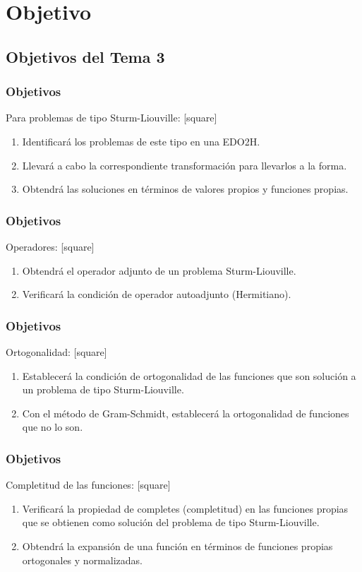 \documentclass[12pt]{beamer}
\begin{document}
\section{Objetivo}
\subsection{Objetivos del Tema 3}

\begin{frame}
\frametitle{Objetivos}
Para problemas de tipo Sturm-Liouville:
[square]
\begin{enumerate}[<+->]
\item Identificará los problemas de este tipo en una EDO2H.
\item Llevará a cabo la correspondiente transformación para llevarlos a la forma.
\item Obtendrá las soluciones en términos de valores propios y funciones propias.
\seti
\end{enumerate}
\end{frame}
\begin{frame}
\frametitle{Objetivos}
Operadores:
[square]
\begin{enumerate}[<+->]
\conti
\item Obtendrá el operador adjunto de un problema Sturm-Liouville.
\item Verificará la condición de operador autoadjunto (Hermitiano).
\seti
\end{enumerate}
\end{frame}
\begin{frame}
\frametitle{Objetivos}
Ortogonalidad:
[square]
\begin{enumerate}[<+->]
\conti
\item Establecerá la condición de ortogonalidad de las funciones que son solución a un problema de tipo Sturm-Liouville.
\item Con el método de Gram-Schmidt, establecerá la ortogonalidad de funciones que no lo son.
\seti
\end{enumerate}
\end{frame}
\begin{frame}
\frametitle{Objetivos}
Completitud de las funciones:
[square]
\begin{enumerate}[<+->]
\conti
\item Verificará la propiedad de completes (completitud) en las funciones propias que se obtienen como solución del problema de tipo Sturm-Liouville.
\item Obtendrá la expansión de una función en términos de funciones propias ortogonales y normalizadas.
\end{enumerate}
\end{frame}
\end{document}
